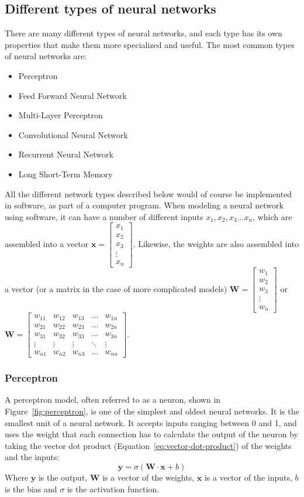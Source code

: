 \documentclass[titlepage]{article}
\begin{document}
\subsection{Different types of neural networks}
There are many different types of neural networks, and each type has its own properties that make them more specialized and useful. The most common types of neural networks are:
\begin{itemize}
    \item Perceptron
    \item Feed Forward Neural Network
    \item Multi-Layer Perceptron
    \item Convolutional Neural Network
    \item Recurrent Neural Network
    \item Long Short-Term Memory
\end{itemize} 
All the different network types described below would of course be implemented in software, as part of a computer program. When modeling a neural network using software, it can have a number of different inputs $x_1, x_2, x_3 ... x_n$, which are assembled into a vector $\textbf{x}=\begin{bmatrix}x_1\\x_2\\x_3\\\vdots\\x_n\end{bmatrix}$. Likewise, the weights are also assembled into a vector (or a matrix in the case of more complicated models) $\textbf{W}=\begin{bmatrix}w_1\\w_2\\w_3\\\vdots\\w_n\end{bmatrix}$ or $\textbf{W}=\begin{bmatrix}w_{11}&w_{12}&w_{13}&\dots&w_{1n}\\w_{21}&w_{22}&w_{23}&\dots&w_{2n}\\w_{31}&w_{32}&w_{33}&\dots&w_{3n}\\\vdots&\vdots&\vdots&\ddots&\vdots\\w_{n1}&w_{n2}&w_{n3}&\dots&w_{nn}\end{bmatrix}$.
\subsubsection{Perceptron}
A perceptron model, often referred to as a neuron, shown in Figure~\ref{fig:perceptron}, is one of the simplest and oldest neural networks. It is the smallest unit of a neural network. It accepts inputs ranging between 0 and 1, and uses the weight that each connection has to calculate the output of the neuron by taking the vector dot product (Equation~\ref{eq:vector-dot-product}) of the weights and the inputs:
\begin{equation}
    \textbf{y} = \sigma(\textbf{W}\cdot\textbf{x} + b)
    \label{eq:perceptron}
\end{equation}
Where $\textbf{y}$ is the output, $\textbf{W}$ is a vector of the weights, $\textbf{x}$ is a vector of the inputs, $b$ is the bias and $\sigma$ is the activation function.
\end{document}
